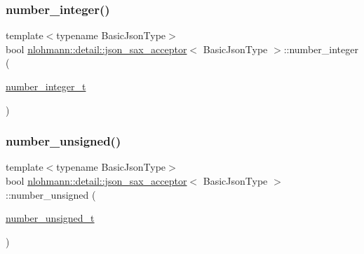 \subsubsection{\texorpdfstring{number\_integer()}{number\_integer()}}
{\footnotesize\ttfamily template$<$typename Basic\+Json\+Type$>$ \\
bool \mbox{\hyperlink{classnlohmann_1_1detail_1_1json__sax__acceptor}{nlohmann\+::detail\+::json\+\_\+sax\+\_\+acceptor}}$<$ Basic\+Json\+Type $>$\+::number\+\_\+integer (\begin{DoxyParamCaption}\item[{\mbox{\hyperlink{classnlohmann_1_1detail_1_1json__sax__acceptor_a41876b17c0e8bdb55580eaf5e4e2ded8}{number\+\_\+integer\+\_\+t}}}]{ }\end{DoxyParamCaption})\hspace{0.3cm}{\ttfamily [inline]}}

\mbox{\label{classnlohmann_1_1detail_1_1json__sax__acceptor_ad15b288f3351287edbe289502f595491}} 
\subsubsection{\texorpdfstring{number\_unsigned()}{number\_unsigned()}}
{\footnotesize\ttfamily template$<$typename Basic\+Json\+Type$>$ \\
bool \mbox{\hyperlink{classnlohmann_1_1detail_1_1json__sax__acceptor}{nlohmann\+::detail\+::json\+\_\+sax\+\_\+acceptor}}$<$ Basic\+Json\+Type $>$\+::number\+\_\+unsigned (\begin{DoxyParamCaption}\item[{\mbox{\hyperlink{classnlohmann_1_1detail_1_1json__sax__acceptor_ae07454608ea6f3cfb765f95e3c850043}{number\+\_\+unsigned\+\_\+t}}}]{ }\end{DoxyParamCaption})\hspace{0.3cm}{\ttfamily [inline]}}

\mbox{\label{classnlohmann_1_1detail_1_1json__sax__acceptor_a95bb3e8b6feaa523ecda8106fb5e38e3}} 
